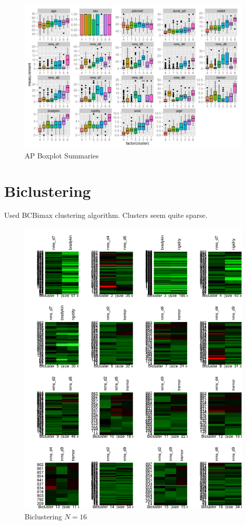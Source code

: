 \documentclass[letterpaper,12pt]{article}
\begin{document}
\begin{figure}[h]
  \centering
  \includegraphics[width=\linewidth]{ap-summaries.pdf}
  \caption{AP Boxplot Summaries}
  \label{fig:ap-summaries}
\end{figure}

\section{Biclustering}

Used BCBimax clustering algorithm. Clusters seem quite sparse.

\begin{figure}[h]
  \centering
  \includegraphics[width=\linewidth]{biclust-16.pdf}
  \caption{Biclustering $N = 16$}
  \label{fig:biclust-16}
\end{figure}
\end{document}
